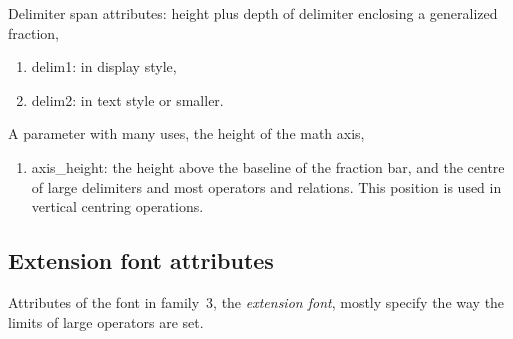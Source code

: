 \documentclass[twoside,letterpaper,openright]{rapport3}
\begin{document}
Delimiter span attributes: height plus depth of delimiter enclosing
a generalized fraction,
\begin{enumerate} %
\item delim1:
in display style,
\item delim2:
in text style or smaller.
\end{enumerate}

A parameter with many uses, the height of the math axis,
\begin{enumerate} %
\item axis\_height:
the height above the baseline
of the fraction bar, and the centre of large delimiters
and most operators and relations. This position is
used in vertical centring operations.
\end{enumerate}


\subsection{Extension font attributes}


Attributes of the font in family~3, the \emph{extension font},
mostly specify
the way the limits of large operators are set.
\end{document}
